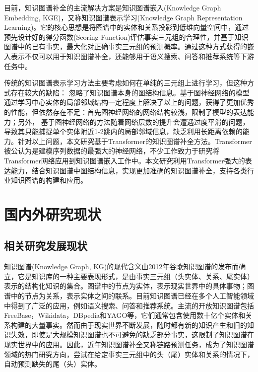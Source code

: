 目前，知识图谱补全的主流解决方案是知识图谱嵌入(Knowledge Graph Embedding, KGE)，又称知识图谱表示学习(Knowledge Graph Representation Learning)。它的核心思想是将图谱中的实体和关系投影到低维向量空间中，通过预先设计好的得分函数(Scoring Function)评估事实三元组的合理性，并基于知识图谱中的已有事实，最大化对正确事实三元组的预测概率。通过这种方式获得的嵌入表示不仅可以用于知识图谱补全，还能够用于语义搜索、问答和推荐系统等下游任务中。

传统的知识图谱表示学习方法主要考虑如何在单纯的三元组上进行学习，但这种方式存在较大的缺陷：
忽略了知识图谱本身的图结构信息。基于图神经网络的模型通过学习中心实体的局部邻域结构一定程度上解决了以上的问题，获得了更加优秀的性能，但依然存在不足：首先图神经网络的网络结构较浅，限制了模型的表达能力；另外，
基于图神经网络的方法随着网络层数的提升会遭遇过度平滑的问题，导致其只能捕捉单个实体附近1-2跳内的局部邻域信息，缺乏利用长距离依赖的能力。针对以上问题，本文研究基于Transformer的知识图谱补全方法。Transformer被公认为是建模序列数据的最强大的神经网络，不少工作致力于研究将Transformer网络应用到知识图谱嵌入工作中。本文研究利用Transformer强大的表达能力，结合知识图谱中图结构信息，实现更加准确的知识图谱补全，支持各类行业知识图谱的构建和应用。


\section{国内外研究现状}

\subsection{相关研究发展现状}
知识图谱(Knowledge Graph, KG)的现代含义由2012年谷歌知识图谱的发布而确立，它是知识库的一种主要表现形式，是由事实三元组（头实体、关系、尾实体）表示的结构化知识的集合。图谱中的节点为实体，表示现实世界中的具体事物；图谱中的节点为关系，表示实体之间的联系。目前知识图谱已经在多个人工智能领域中得到了广泛的应用，例如语义搜索、问答和推荐系统。主流的开放知识图谱包括FreeBase，Wikidata，DBpedia和YAGO等，它们通常包含使用数十亿个实体和关系构建的大量事实。然而由于现实世界不断发展，随时都有新的知识产生和旧的知识失效，即使是大规模知识图谱也不可避免的缺乏部分事实，这限制了知识图谱在现实世界中的应用。因此，近年知识图谱补全又称链路预测任务，成为了知识图谱领域的热门研究方向，尝试在给定事实三元组中的头（尾）实体和关系的情况下，自动预测缺失的尾（头）实体。

